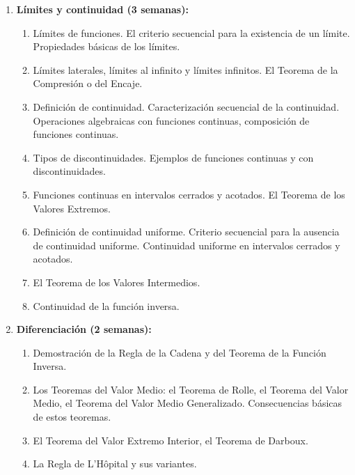 \begin{refsection}
\begin{enumerate}
\item \textbf{Límites y continuidad (3 semanas):} 
\begin{enumerate}
    \item Límites de funciones. El criterio secuencial para la existencia de un límite. Propiedades básicas de los límites.
    \item Límites laterales, límites al infinito y límites infinitos. El Teorema de la Compresión o del Encaje.
    \item Definición de continuidad. Caracterización secuencial de la continuidad. Operaciones algebraicas con funciones continuas, composición de funciones continuas.
    \item Tipos de discontinuidades. Ejemplos de funciones continuas y con discontinuidades.
    \item Funciones continuas en intervalos cerrados y acotados. El Teorema de los Valores Extremos.
    \item Definición de continuidad uniforme. Criterio secuencial para la ausencia de continuidad uniforme. Continuidad uniforme en intervalos cerrados y acotados.
    \item El Teorema de los Valores Intermedios.
    \item Continuidad de la función inversa.
\end{enumerate}

\item \textbf{Diferenciación (2 semanas):} 
\begin{enumerate}
    \item Demostración de la Regla de la Cadena y del Teorema de la Función Inversa.
    \item Los Teoremas del Valor Medio: el Teorema de Rolle, el Teorema del Valor Medio, el Teorema del Valor Medio Generalizado. Consecuencias básicas de estos teoremas.
    \item El Teorema del Valor Extremo Interior, el Teorema de Darboux.
    \item La Regla de L'H\^{o}pital y sus variantes.
\end{enumerate}


\end{enumerate}
\end{refsection}
